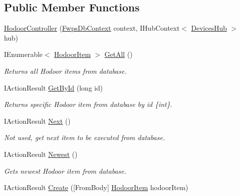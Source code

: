 \subsection*{Public Member Functions}
\begin{DoxyCompactItemize}
\item 
\mbox{\hyperlink{class_f_w_p_s_1_1_controllers_1_1_hodoor_controller_adce9f31ecaab1ed1e08cb9cf09c305f2}{Hodoor\+Controller}} (\mbox{\hyperlink{class_f_w_p_s_1_1_data_1_1_fwps_db_context}{Fwps\+Db\+Context}} context, I\+Hub\+Context$<$ \mbox{\hyperlink{class_f_w_p_s_1_1_devices_hub}{Devices\+Hub}} $>$ hub)
\item 
I\+Enumerable$<$ \mbox{\hyperlink{class_f_w_p_s_1_1_models_1_1_hodoor_item}{Hodoor\+Item}} $>$ \mbox{\hyperlink{class_f_w_p_s_1_1_controllers_1_1_hodoor_controller_a862b9ad647c5e0ff7fda5dd5f359a040}{Get\+All}} ()
\begin{DoxyCompactList}\small\item\em Returns all Hodoor items from database. \end{DoxyCompactList}\item 
I\+Action\+Result \mbox{\hyperlink{class_f_w_p_s_1_1_controllers_1_1_hodoor_controller_a27509de7aa39ce596b256d0cc4cc20f1}{Get\+By\+Id}} (long id)
\begin{DoxyCompactList}\small\item\em Returns specific Hodoor item from database by id \{int\}. \end{DoxyCompactList}\item 
I\+Action\+Result \mbox{\hyperlink{class_f_w_p_s_1_1_controllers_1_1_hodoor_controller_ac5008a5159d83bffd779b742bd9e6555}{Next}} ()
\begin{DoxyCompactList}\small\item\em Not used, get next item to be executed from database. \end{DoxyCompactList}\item 
I\+Action\+Result \mbox{\hyperlink{class_f_w_p_s_1_1_controllers_1_1_hodoor_controller_a35f759a06b813cb402420ab98e64000c}{Newest}} ()
\begin{DoxyCompactList}\small\item\em Gets newest Hodoor item from database. \end{DoxyCompactList}\item 
I\+Action\+Result \mbox{\hyperlink{class_f_w_p_s_1_1_controllers_1_1_hodoor_controller_a10c4a8b451c2ed13e161beca8341e5dc}{Create}} (\mbox{[}From\+Body\mbox{]} \mbox{\hyperlink{class_f_w_p_s_1_1_models_1_1_hodoor_item}{Hodoor\+Item}} hodoor\+Item)

\end{DoxyCompactItemize}
